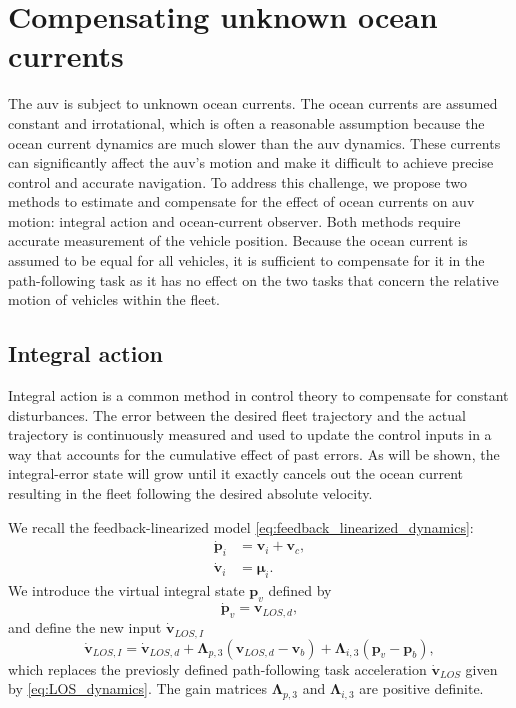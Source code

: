 \section{Compensating unknown ocean currents}\label{sec:ocean_current}
The \gls{auv} is subject to unknown ocean currents. The ocean currents are assumed constant and irrotational, which is often a reasonable assumption because the ocean current dynamics are much slower than the \gls{auv} dynamics. These currents can significantly affect the \gls{auv}'s motion and make it difficult to achieve precise control and accurate navigation. To address this challenge, we propose two methods to estimate and compensate for the effect of ocean currents on \gls{auv} motion: integral action and ocean-current observer. Both methods require accurate measurement of the vehicle position. Because the ocean current is assumed to be equal for all vehicles, it is sufficient to compensate for it in the path-following task as it has no effect on the two tasks that concern the relative motion of vehicles within the fleet.

\subsection{Integral action}\label{sec:integral_action}
Integral action is a common method in control theory to compensate for constant disturbances. The error between the desired fleet trajectory and the actual trajectory is continuously measured and used to update the control inputs in a way that accounts for the cumulative effect of past errors. As will be shown, the integral-error state will grow until it exactly cancels out the ocean current resulting in the fleet following the desired absolute velocity.

We recall the feedback-linearized model \eqref{eq:feedback_linearized_dynamics}:
\begin{align*}
    \dot{\mathbf{p}}_i &= \mathbf{v}_i + \mathbf{v}_c,\\
    \dot{\mathbf{v}}_i &= \bm{\mu}_i.
\end{align*}
We introduce the virtual integral state $\mathbf{p}_v$ defined by
\begin{equation}\label{eq:los_integral_state}
    \dot{\mathbf{p}}_v = \mathbf{v}_{LOS,d},
\end{equation}
and define the new input $\dot{\mathbf{v}}_{LOS,I}$
\begin{equation} \label{eq:LOS_integral_controller}
    \dot{\mathbf{v}}_{LOS,I} = \dot{\mathbf{v}}_{LOS,d} + \mathbf{\Lambda}_{p,3} (\mathbf{v}_{LOS,d} - \mathbf{v}_b) + \mathbf{\Lambda}_{i,3} (\mathbf{p}_v-\mathbf{p}_b),
\end{equation}
which replaces the previosly defined path-following task acceleration $\dot{\mathbf{v}}_{LOS}$ given by \eqref{eq:LOS_dynamics}. The gain matrices $\mathbf{\Lambda}_{p,3}$ and $\mathbf{\Lambda}_{i,3}$ are positive definite.


